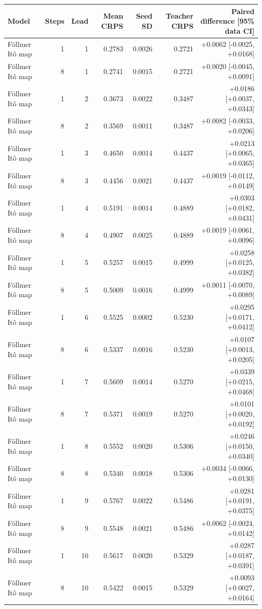 \begin{tabular}{lrrrrrr}
\toprule
Model & Steps & Lead & Mean CRPS & Seed SD & Teacher CRPS & Paired difference [95\% data CI] \\
\midrule
Föllmer Itô map & 1 & 1 & 0.2783 & 0.0026 & 0.2721 & +0.0062 [-0.0025, +0.0168] \\
Föllmer Itô map & 8 & 1 & 0.2741 & 0.0015 & 0.2721 & +0.0020 [-0.0045, +0.0091] \\
Föllmer Itô map & 1 & 2 & 0.3673 & 0.0022 & 0.3487 & +0.0186 [+0.0037, +0.0343] \\
Föllmer Itô map & 8 & 2 & 0.3569 & 0.0011 & 0.3487 & +0.0082 [-0.0033, +0.0206] \\
Föllmer Itô map & 1 & 3 & 0.4650 & 0.0014 & 0.4437 & +0.0213 [+0.0065, +0.0365] \\
Föllmer Itô map & 8 & 3 & 0.4456 & 0.0021 & 0.4437 & +0.0019 [-0.0112, +0.0149] \\
Föllmer Itô map & 1 & 4 & 0.5191 & 0.0014 & 0.4889 & +0.0303 [+0.0182, +0.0431] \\
Föllmer Itô map & 8 & 4 & 0.4907 & 0.0025 & 0.4889 & +0.0019 [-0.0061, +0.0096] \\
Föllmer Itô map & 1 & 5 & 0.5257 & 0.0015 & 0.4999 & +0.0258 [+0.0125, +0.0382] \\
Föllmer Itô map & 8 & 5 & 0.5009 & 0.0016 & 0.4999 & +0.0011 [-0.0070, +0.0089] \\
Föllmer Itô map & 1 & 6 & 0.5525 & 0.0002 & 0.5230 & +0.0295 [+0.0171, +0.0412] \\
Föllmer Itô map & 8 & 6 & 0.5337 & 0.0016 & 0.5230 & +0.0107 [+0.0013, +0.0205] \\
Föllmer Itô map & 1 & 7 & 0.5609 & 0.0014 & 0.5270 & +0.0339 [+0.0215, +0.0468] \\
Föllmer Itô map & 8 & 7 & 0.5371 & 0.0019 & 0.5270 & +0.0101 [+0.0020, +0.0192] \\
Föllmer Itô map & 1 & 8 & 0.5552 & 0.0020 & 0.5306 & +0.0246 [+0.0150, +0.0340] \\
Föllmer Itô map & 8 & 8 & 0.5340 & 0.0018 & 0.5306 & +0.0034 [-0.0066, +0.0130] \\
Föllmer Itô map & 1 & 9 & 0.5767 & 0.0022 & 0.5486 & +0.0281 [+0.0191, +0.0375] \\
Föllmer Itô map & 8 & 9 & 0.5548 & 0.0021 & 0.5486 & +0.0062 [-0.0024, +0.0142] \\
Föllmer Itô map & 1 & 10 & 0.5617 & 0.0020 & 0.5329 & +0.0287 [+0.0187, +0.0391] \\
Föllmer Itô map & 8 & 10 & 0.5422 & 0.0015 & 0.5329 & +0.0093 [+0.0027, +0.0164] \\

\end{tabular}
